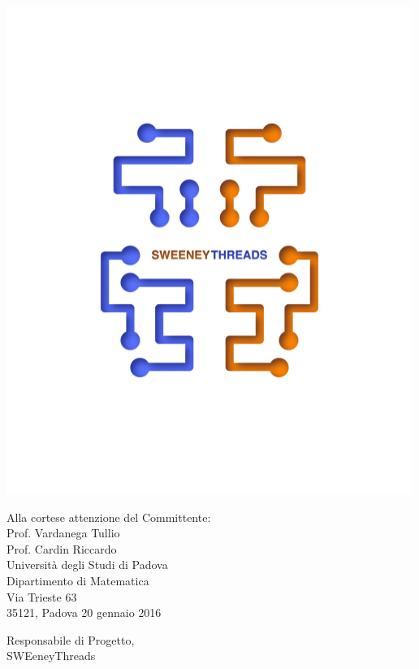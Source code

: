 \documentclass[a4paper]{article}
\begin{document}
	\noindent\begin{minipage}{0.3\textwidth}
		\includegraphics[scale=0.6]{sweeney.png}
	\end{minipage}
	\begin{minipage}{0.7\textwidth}
		\begin{flushright}
			Alla cortese attenzione del Committente: \\
			Prof. Vardanega Tullio \\
			Prof. Cardin Riccardo \\
			Università degli Studi di Padova \\
			Dipartimento di Matematica \\
			Via Trieste 63\\
			35121, Padova
			\vspace{5mm} 20 gennaio 2016
		\end{flushright}
	\end{minipage}
	
	\begin{minipage}{\textwidth}
		\begin{flushleft}
			Responsabile di Progetto,\\
			SWEeneyThreads\\
		\end{flushleft}
	\end{minipage}	
\end{document}

